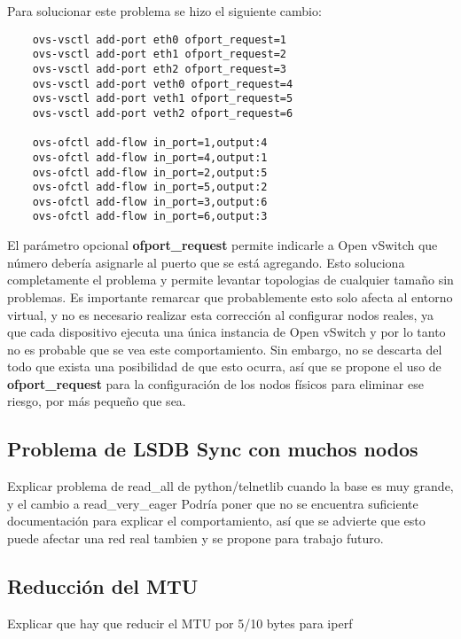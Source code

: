 Para solucionar este problema se hizo el siguiente cambio:
\begin{lstlisting}
	ovs-vsctl add-port eth0 ofport_request=1
	ovs-vsctl add-port eth1 ofport_request=2
	ovs-vsctl add-port eth2 ofport_request=3
	ovs-vsctl add-port veth0 ofport_request=4
	ovs-vsctl add-port veth1 ofport_request=5
	ovs-vsctl add-port veth2 ofport_request=6
	
	ovs-ofctl add-flow in_port=1,output:4
	ovs-ofctl add-flow in_port=4,output:1
	ovs-ofctl add-flow in_port=2,output:5
	ovs-ofctl add-flow in_port=5,output:2
	ovs-ofctl add-flow in_port=3,output:6
	ovs-ofctl add-flow in_port=6,output:3
\end{lstlisting}
El parámetro opcional \textbf{ofport\_request} permite indicarle a Open vSwitch que número debería asignarle al puerto que se está agregando. Esto soluciona completamente el problema y permite levantar topologias de cualquier tamaño sin problemas. Es importante remarcar que probablemente esto solo afecta al entorno virtual, y no es necesario realizar esta corrección al configurar nodos reales, ya que cada dispositivo ejecuta una única instancia de Open vSwitch y por lo tanto no es probable que se vea este comportamiento. Sin embargo, no se descarta del todo que exista una posibilidad de que esto ocurra, así que se propone el uso de \textbf{ofport\_request} para la configuración de los nodos físicos para eliminar ese riesgo, por más pequeño que sea.

\subsection{Problema de LSDB Sync con muchos nodos}
Explicar problema de read\_all\(\) de python/telnetlib cuando la base es muy grande, y el cambio a read\_very\_eager\(\)
Podría poner que no se encuentra suficiente documentación para explicar el comportamiento, así que se advierte que esto puede afectar una red real tambien y se propone para trabajo futuro.

\subsection{Reducción del MTU}
Explicar que hay que reducir el MTU por 5/10 bytes para iperf

